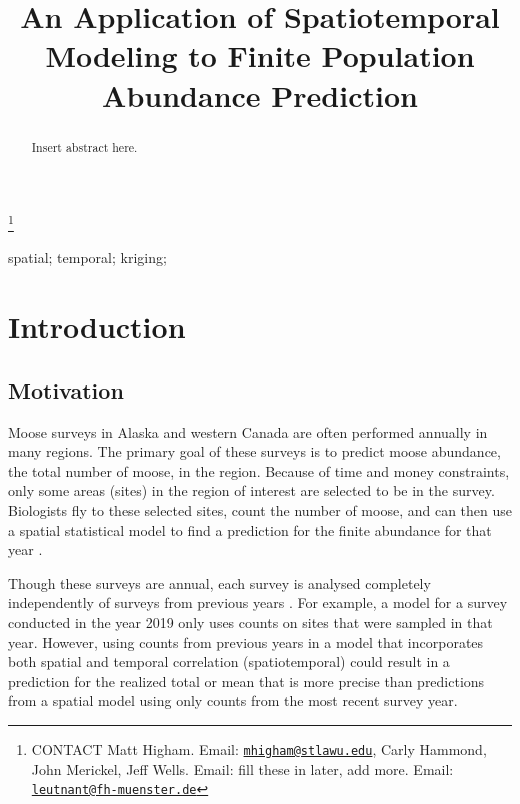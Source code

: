 \documentclass[]{interact}
\theoremstyle{plain}%
\theoremstyle{definition}
\theoremstyle{remark}
\begin{document}

\title{An Application of Spatiotemporal Modeling to Finite Population
Abundance Prediction}


\author{
}

\thanks{CONTACT Matt
Higham. Email: \href{mailto:mhigham@stlawu.edu}{\nolinkurl{mhigham@stlawu.edu}}, Carly
Hammond, John Merickel, Jeff Wells. Email: fill these in later, add
more. Email: \href{mailto:leutnant@fh-muenster.de}{\nolinkurl{leutnant@fh-muenster.de}}}

\maketitle

\begin{abstract}
Insert abstract here.
\end{abstract}

\begin{keywords}
spatial; temporal; kriging;
\end{keywords}

\section{Introduction}

\subsection{Motivation}

Moose surveys in Alaska and western Canada are often performed annually
in many regions. The primary goal of these surveys is to predict moose
abundance, the total number of moose, in the region. Because of time and
money constraints, only some areas (sites) in the region of interest are
selected to be in the survey. Biologists fly to these selected sites,
count the number of moose, and can then use a spatial statistical model
to find a prediction for the finite abundance for that year
\citep{ver2008spatial}.

Though these surveys are annual, each survey is analysed completely
independently of surveys from previous years
\citep[e.g.][]{gasaway1986estimating, kellie_geospatial_2006, boertje2009managing, peters2014contrasting}.
For example, a model for a survey conducted in the year 2019 only uses
counts on sites that were sampled in that year. However, using counts
from previous years in a model that incorporates both spatial and
temporal correlation (spatiotemporal) could result in a prediction for
the realized total or mean that is more precise than predictions from a
spatial model using only counts from the most recent survey year.
\end{document}

